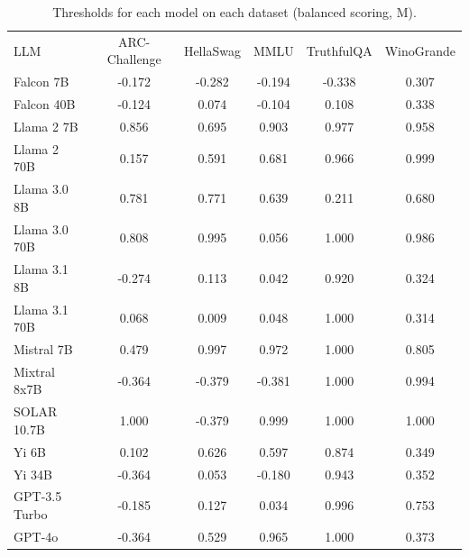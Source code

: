 \begin{table}[h]
\caption{Thresholds for each model on each dataset (balanced scoring, M). }
\label{tab:thresholds_prob_entropy_k20_w1}
\centering
\begin{tabular}{l S[table-format=3.1] S[table-format=3.1] S[table-format=3.1] S[table-format=3.1] S[table-format=3.1]}
\toprule
LLM & ARC-Challenge & HellaSwag & MMLU & TruthfulQA & WinoGrande \\ 
\cmidrule(lr){1-1} \cmidrule(lr){2-2} \cmidrule(lr){3-3} \cmidrule(lr){4-4} \cmidrule(lr){5-5} \cmidrule(lr){6-6}
Falcon 7B & -0.172 & -0.282 & -0.194 & -0.338 & 0.307\\
Falcon 40B & -0.124 & 0.074 & -0.104 & 0.108 & 0.338\\
Llama 2 7B & 0.856 & 0.695 & 0.903 & 0.977 & 0.958\\
Llama 2 70B & 0.157 & 0.591 & 0.681 & 0.966 & 0.999\\
Llama 3.0 8B & 0.781 & 0.771 & 0.639 & 0.211 & 0.680\\
Llama 3.0 70B & 0.808 & 0.995 & 0.056 & 1.000 & 0.986\\
Llama 3.1 8B & -0.274 & 0.113 & 0.042 & 0.920 & 0.324\\
Llama 3.1 70B & 0.068 & 0.009 & 0.048 & 1.000 & 0.314\\
Mistral 7B & 0.479 & 0.997 & 0.972 & 1.000 & 0.805\\
Mixtral 8x7B & -0.364 & -0.379 & -0.381 & 1.000 & 0.994\\
SOLAR 10.7B & 1.000 & -0.379 & 0.999 & 1.000 & 1.000\\
Yi 6B & 0.102 & 0.626 & 0.597 & 0.874 & 0.349\\
Yi 34B & -0.364 & 0.053 & -0.180 & 0.943 & 0.352\\
GPT-3.5 Turbo & -0.185 & 0.127 & 0.034 & 0.996 & 0.753\\
GPT-4o & -0.364 & 0.529 & 0.965 & 1.000 & 0.373\\
\bottomrule
\end{tabular}
\end{table}
